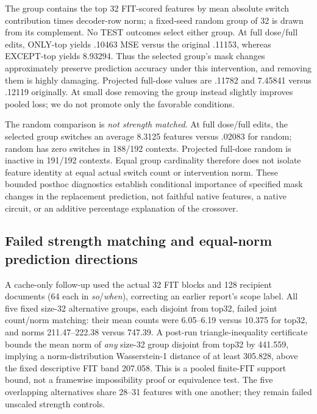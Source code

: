 The group contains the top 32 FIT-scored features by mean absolute switch contribution times decoder-row norm; a fixed-seed random group of 32 is drawn from its complement. No TEST outcomes select either group. At full dose/full edits, ONLY-top yields .10463 MSE versus the original .11153, whereas EXCEPT-top yields 8.93294. Thus the selected group's mask changes approximately preserve prediction accuracy under this intervention, and removing them is highly damaging. Projected full-dose values are .11782 and 7.45841 versus .12119 originally. At small dose removing the group instead slightly improves pooled loss; we do not promote only the favorable conditions.

The random comparison is \emph{not strength matched}. At full dose/full edits, the selected group switches an average 8.3125 features versus .02083 for random; random has zero switches in 188/192 contexts. Projected full-dose random is inactive in 191/192 contexts. Equal group cardinality therefore does not isolate feature identity at equal actual switch count or intervention norm. These bounded posthoc diagnostics establish conditional importance of specified mask changes in the replacement prediction, not faithful native features, a native circuit, or an additive percentage explanation of the crossover.


\subsection{Failed strength matching and equal-norm prediction directions}\label{sec:normnew}
A cache-only follow-up used the actual 32 FIT blocks and 128 recipient documents (64 each in \emph{so}/\emph{when}), correcting an earlier report's scope label. All five fixed size-32 alternative groups, each disjoint from top32, failed joint count/norm matching: their mean counts were 6.05--6.19 versus 10.375 for top32, and norms 211.47--222.38 versus 747.39. A post-run triangle-inequality certificate bounds the mean norm of \emph{any} size-32 group disjoint from top32 by 441.559, implying a norm-distribution Wasserstein-1 distance of at least 305.828, above the fixed descriptive FIT band 207.058. This is a pooled finite-FIT support bound, not a framewise impossibility proof or equivalence test. The five overlapping alternatives share 28--31 features with one another; they remain failed unscaled strength controls.

